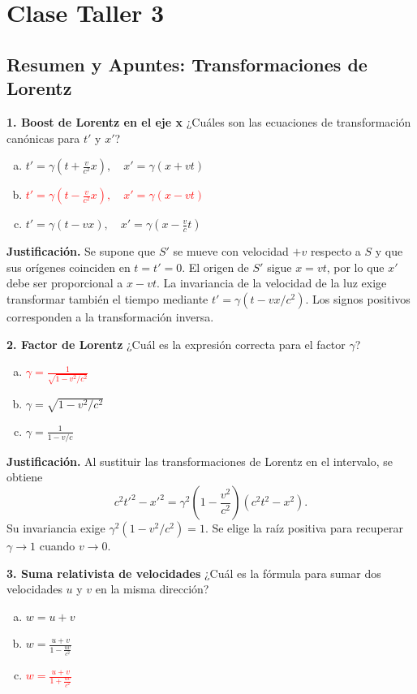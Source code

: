 \chapter{Clase Taller 3}


\section{Resumen y Apuntes: Transformaciones de Lorentz}

\textbf{1. Boost de Lorentz en el eje x}
¿Cuáles son las ecuaciones de transformación canónicas para $t'$ y $x'$?
\begin{enumerate}[a)]
    \item $t' = \gamma(t + \frac{v}{c^2}x), \quad x' = \gamma(x + vt)$
    \item \textcolor{red}{$t' = \gamma(t - \frac{v}{c^2}x), \quad x' = \gamma(x - vt)$}
    \item $t' = \gamma(t - vx), \quad x' = \gamma(x - \frac{v}{c}t)$
\end{enumerate}

\textbf{Justificación.} Se supone que $S'$ se mueve con velocidad $+v$ respecto a $S$ y que sus orígenes coinciden en $t=t'=0$. El origen de $S'$ sigue $x=vt$, por lo que $x'$ debe ser proporcional a $x-vt$. La invariancia de la velocidad de la luz exige transformar también el tiempo mediante $t'=\gamma(t-vx/c^2)$. Los signos positivos corresponden a la transformación inversa.

\textbf{2. Factor de Lorentz}
¿Cuál es la expresión correcta para el factor $\gamma$?
\begin{enumerate}[a)]
    \item \textcolor{red}{$\gamma = \frac{1}{\sqrt{1 - v^2/c^2}}$}
    \item $\gamma = \sqrt{1 - v^2/c^2}$
    \item $\gamma = \frac{1}{1 - v/c}$
\end{enumerate}

\textbf{Justificación.} Al sustituir las transformaciones de Lorentz en el intervalo, se obtiene
\[
c^2t'^2-x'^2=\gamma^2\left(1-\frac{v^2}{c^2}\right)(c^2t^2-x^2).
\]
Su invariancia exige $\gamma^2(1-v^2/c^2)=1$. Se elige la raíz positiva para recuperar $\gamma\to1$ cuando $v\to0$.

\textbf{3. Suma relativista de velocidades}
¿Cuál es la fórmula para sumar dos velocidades $u$ y $v$ en la misma dirección?
\begin{enumerate}[a)]
    \item $w = u + v$
    \item $w = \frac{u + v}{1 - \frac{uv}{c^2}}$
    \item \textcolor{red}{$w = \frac{u + v}{1 + \frac{uv}{c^2}}$}
\end{enumerate}

